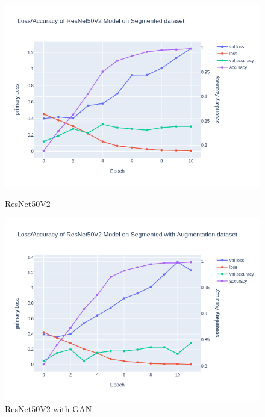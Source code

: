 \documentclass[12pt]{diazessay}
\begin{document}
    \begin{figure}[H]
        \centering
        \begin{minipage}[b]{0.45\textwidth}
            \centering
            \includegraphics[width=\textwidth]{charts/ResNet50V2_classification.png}
            \caption{\small{ResNet50V2}}
        \end{minipage}
        \hfill
        \begin{minipage}[b]{0.45\textwidth}
            \centering
            \includegraphics[width=\textwidth]{charts/ResNet50V2_classificationWithGAN.png}
            \caption{\small{ResNet50V2 with GAN}}
        \end{minipage}
    \end{figure}
\end{document}
